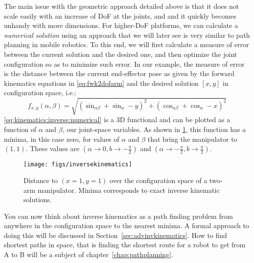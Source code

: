 The main issue with the geometric approach detailed above is that it does not scale easily with an increase of DoF at the joints, and and it quickly becomes unhandy with more dimensions.
For higher-DoF platforms, we can calculate a \textsl{numerical solution} using an approach that we will later see is very similar to path planning in mobile robotics.
To this end, we will first calculate a measure of error between the current solution and the desired one, and then optimize the joint configuration so as to minimize such error.
In our example, the measure of error is the distance between the current end-effector pose as given by the forward kinematics equations in \cref{eq:fwk2dofarm} and the desired solution $[x,y]$ in configuration space, i.e.:
\begin{equation}\label{eq:kinematics:inverse:numerical}
f_{x,y}(\alpha,\beta)=\sqrt{\left(\sin_{\alpha\beta} + \sin_\alpha - y\right)^2 + \left(\cos_{\alpha\beta}+\cos_\alpha - x\right)^2}
\end{equation}
\cref{eq:kinematics:inverse:numerical} is a 3D functional and can be plotted as a function of $\alpha$ and $\beta$, our joint-space variables.
As shown in \cref{fig:inversekinematics}, this function has a minima, in this case zero, for values of $\alpha$ and $\beta$ that bring the manipulator to $(1,1)$. These values are $(\alpha \rightarrow 0, b \rightarrow -\frac{\pi}{2})$ and $(\alpha \rightarrow -\frac{\pi}{2}, b \rightarrow \frac{\pi}{2})$.

\begin{figure}
    \centering
        \texttt{[image: figs/inversekinematics]}
    \caption{Distance to $(x=1,y=1)$ over the configuration space of a two-arm manipulator. Minima corresponds to exact inverse kinematic solutions.}
    \label{fig:inversekinematics}
\end{figure}

You can now think about inverse kinematics as a path finding problem from anywhere in the configuration space to the nearest minima. A formal approach to doing this will be discussed in Section~\ref{sec:advinvkinematics}. How to find shortest paths in space, that is finding the shortest route for a robot to get from A to B will be a subject of chapter~\ref{chap:pathplanning}.

